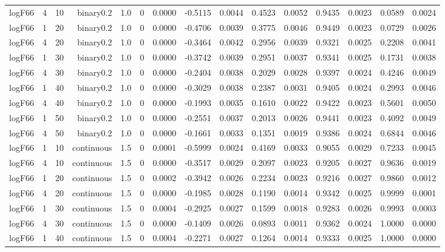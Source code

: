 \begin{longtable}{rrrrrrrrrrrrrrr}
  logF66 & 4 & 10 & binary0.2 & 1.0 & 0 & 0.0000 & -0.5115 & 0.0044 & 0.4523 & 0.0052 & 0.9435 & 0.0023 & 0.0589 & 0.0024 \\ 
  logF66 & 1 & 20 & binary0.2 & 1.0 & 0 & 0.0000 & -0.4706 & 0.0039 & 0.3775 & 0.0046 & 0.9449 & 0.0023 & 0.0729 & 0.0026 \\ 
  logF66 & 4 & 20 & binary0.2 & 1.0 & 0 & 0.0000 & -0.3464 & 0.0042 & 0.2956 & 0.0039 & 0.9321 & 0.0025 & 0.2208 & 0.0041 \\ 
  logF66 & 1 & 30 & binary0.2 & 1.0 & 0 & 0.0000 & -0.3742 & 0.0039 & 0.2951 & 0.0037 & 0.9341 & 0.0025 & 0.1731 & 0.0038 \\ 
  logF66 & 4 & 30 & binary0.2 & 1.0 & 0 & 0.0000 & -0.2404 & 0.0038 & 0.2029 & 0.0028 & 0.9397 & 0.0024 & 0.4246 & 0.0049 \\ 
  logF66 & 1 & 40 & binary0.2 & 1.0 & 0 & 0.0000 & -0.3029 & 0.0038 & 0.2387 & 0.0031 & 0.9405 & 0.0024 & 0.2993 & 0.0046 \\ 
  logF66 & 4 & 40 & binary0.2 & 1.0 & 0 & 0.0000 & -0.1993 & 0.0035 & 0.1610 & 0.0022 & 0.9422 & 0.0023 & 0.5601 & 0.0050 \\ 
  logF66 & 1 & 50 & binary0.2 & 1.0 & 0 & 0.0000 & -0.2551 & 0.0037 & 0.2013 & 0.0026 & 0.9441 & 0.0023 & 0.4092 & 0.0049 \\ 
  logF66 & 4 & 50 & binary0.2 & 1.0 & 0 & 0.0000 & -0.1661 & 0.0033 & 0.1351 & 0.0019 & 0.9386 & 0.0024 & 0.6844 & 0.0046 \\ 
  logF66 & 1 & 10 & continuous & 1.5 & 0 & 0.0001 & -0.5999 & 0.0024 & 0.4169 & 0.0033 & 0.9055 & 0.0029 & 0.7233 & 0.0045 \\ 
  logF66 & 4 & 10 & continuous & 1.5 & 0 & 0.0000 & -0.3517 & 0.0029 & 0.2097 & 0.0023 & 0.9205 & 0.0027 & 0.9636 & 0.0019 \\ 
  logF66 & 1 & 20 & continuous & 1.5 & 0 & 0.0002 & -0.3942 & 0.0026 & 0.2234 & 0.0023 & 0.9216 & 0.0027 & 0.9860 & 0.0012 \\ 
  logF66 & 4 & 20 & continuous & 1.5 & 0 & 0.0000 & -0.1985 & 0.0028 & 0.1190 & 0.0014 & 0.9342 & 0.0025 & 0.9999 & 0.0001 \\ 
  logF66 & 1 & 30 & continuous & 1.5 & 0 & 0.0004 & -0.2925 & 0.0027 & 0.1599 & 0.0018 & 0.9283 & 0.0026 & 0.9993 & 0.0003 \\ 
  logF66 & 4 & 30 & continuous & 1.5 & 0 & 0.0000 & -0.1409 & 0.0026 & 0.0893 & 0.0011 & 0.9362 & 0.0024 & 1.0000 & 0.0000 \\ 
  logF66 & 1 & 40 & continuous & 1.5 & 0 & 0.0004 & -0.2271 & 0.0027 & 0.1264 & 0.0014 & 0.9333 & 0.0025 & 1.0000 & 0.0000 \\ 

\end{longtable}
